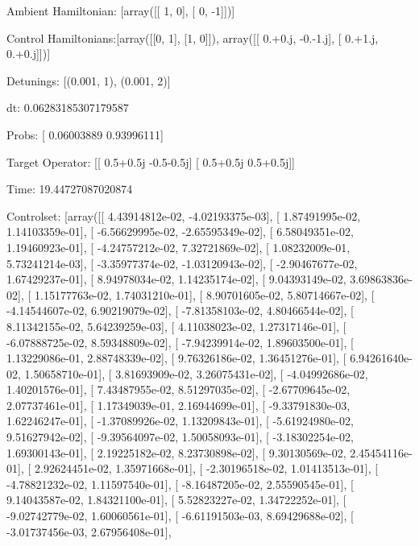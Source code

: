 \documentclass{article}
\begin{document}
    

\newpage

Ambient Hamiltonian: [array([[ 1,  0],
       [ 0, -1]])]

Control Hamiltonians:[array([[0, 1],
       [1, 0]]), array([[ 0.+0.j, -0.-1.j],
       [ 0.+1.j,  0.+0.j]])]

Detunings: [(0.001, 1), (0.001, 2)]

 dt: 0.06283185307179587

Probs: [ 0.06003889  0.93996111]

Target Operator: [[ 0.5+0.5j -0.5-0.5j]
 [ 0.5+0.5j  0.5+0.5j]]

Time: 19.44727087020874

Controlset: [array([[  4.43914812e-02,  -4.02193375e-03],
       [  1.87491995e-02,   1.14103359e-01],
       [ -6.56629995e-02,  -2.65595349e-02],
       [  6.58049351e-02,   1.19460923e-01],
       [ -4.24757212e-02,   7.32721869e-02],
       [  1.08232009e-01,   5.73241214e-03],
       [ -3.35977374e-02,  -1.03120943e-02],
       [ -2.90467677e-02,   1.67429237e-01],
       [  8.94978034e-02,   1.14235174e-02],
       [  9.04393149e-02,   3.69863836e-02],
       [  1.15177763e-02,   1.74031210e-01],
       [  8.90701605e-02,   5.80714667e-02],
       [ -4.14544607e-02,   6.90219079e-02],
       [ -7.81358103e-02,   4.80466544e-02],
       [  8.11342155e-02,   5.64239259e-03],
       [  4.11038023e-02,   1.27317146e-01],
       [ -6.07888725e-02,   8.59348809e-02],
       [ -7.94239914e-02,   1.89603500e-01],
       [  1.13229086e-01,   2.88748339e-02],
       [  9.76326186e-02,   1.36451276e-01],
       [  6.94261640e-02,   1.50658710e-01],
       [  3.81693909e-02,   3.26075431e-02],
       [ -4.04992686e-02,   1.40201576e-01],
       [  7.43487955e-02,   8.51297035e-02],
       [ -2.67709645e-02,   2.07737461e-01],
       [  1.17349039e-01,   2.16944699e-01],
       [ -9.33791830e-03,   1.62246247e-01],
       [ -1.37089926e-02,   1.13209843e-01],
       [ -5.61924980e-02,   9.51627942e-02],
       [ -9.39564097e-02,   1.50058093e-01],
       [ -3.18302254e-02,   1.69300143e-01],
       [  2.19225182e-02,   8.23730898e-02],
       [  9.30130569e-02,   2.45454116e-01],
       [  2.92624451e-02,   1.35971668e-01],
       [ -2.30196518e-02,   1.01413513e-01],
       [ -4.78821232e-02,   1.11597540e-01],
       [ -8.16487205e-02,   2.55590545e-01],
       [  9.14043587e-02,   1.84321100e-01],
       [  5.52823227e-02,   1.34722252e-01],
       [ -9.02742779e-02,   1.60060561e-01],
       [ -6.61191503e-03,   8.69429688e-02],
       [ -3.01737456e-03,   2.67956408e-01],
\end{document}
